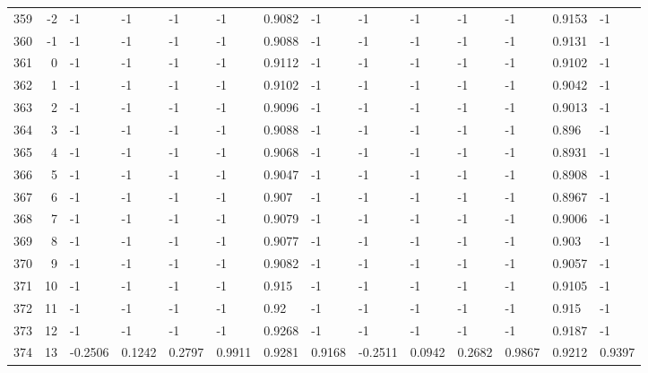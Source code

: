 \begin{table}[p]
{\begin{minipage}{\textheight}
\begin{tabular}{rr||lll|lll||lll|lll}
359    & -2   & -1      & -1      & -1     & -1     & 0.9082 & -1     & -1      & -1      & -1     & -1     & 0.9153 & -1     \\
360    & -1   & -1      & -1      & -1     & -1     & 0.9088 & -1     & -1      & -1      & -1     & -1     & 0.9131 & -1     \\
361    & 0    & -1      & -1      & -1     & -1     & 0.9112 & -1     & -1      & -1      & -1     & -1     & 0.9102 & -1     \\
362    & 1    & -1      & -1      & -1     & -1     & 0.9102 & -1     & -1      & -1      & -1     & -1     & 0.9042 & -1     \\
363    & 2    & -1      & -1      & -1     & -1     & 0.9096 & -1     & -1      & -1      & -1     & -1     & 0.9013 & -1     \\
364    & 3    & -1      & -1      & -1     & -1     & 0.9088 & -1     & -1      & -1      & -1     & -1     & 0.896  & -1     \\
365    & 4    & -1      & -1      & -1     & -1     & 0.9068 & -1     & -1      & -1      & -1     & -1     & 0.8931 & -1     \\
366    & 5    & -1      & -1      & -1     & -1     & 0.9047 & -1     & -1      & -1      & -1     & -1     & 0.8908 & -1     \\
367    & 6    & -1      & -1      & -1     & -1     & 0.907  & -1     & -1      & -1      & -1     & -1     & 0.8967 & -1     \\
368    & 7    & -1      & -1      & -1     & -1     & 0.9079 & -1     & -1      & -1      & -1     & -1     & 0.9006 & -1     \\
369    & 8    & -1      & -1      & -1     & -1     & 0.9077 & -1     & -1      & -1      & -1     & -1     & 0.903  & -1     \\
370    & 9    & -1      & -1      & -1     & -1     & 0.9082 & -1     & -1      & -1      & -1     & -1     & 0.9057 & -1     \\
371    & 10   & -1      & -1      & -1     & -1     & 0.915  & -1     & -1      & -1      & -1     & -1     & 0.9105 & -1     \\
372    & 11   & -1      & -1      & -1     & -1     & 0.92   & -1     & -1      & -1      & -1     & -1     & 0.915  & -1     \\
373    & 12   & -1      & -1      & -1     & -1     & 0.9268 & -1     & -1      & -1      & -1     & -1     & 0.9187 & -1     \\
374    & 13   & -0.2506 & 0.1242  & 0.2797 & 0.9911 & 0.9281 & 0.9168 & -0.2511 & 0.0942  & 0.2682 & 0.9867 & 0.9212 & 0.9397 \\

\end{tabular}
\end{minipage}}
\end{table}
